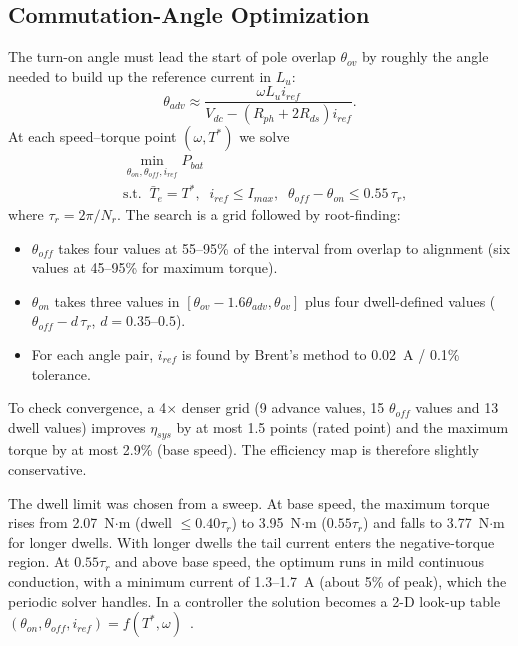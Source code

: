 \documentclass[journal]{IEEEtran}
\begin{document}
\subsection{Commutation-Angle Optimization}
The turn-on angle must lead the start of pole overlap $\theta_{ov}$ by roughly
the angle needed to build up the reference current in $L_u$:
\begin{equation}
\theta_{adv}\approx \frac{\omega L_u i_{ref}}{V_{dc}-(R_{ph}+2R_{ds})i_{ref}}.
\label{eq:adv}
\end{equation}
At each speed--torque point $(\omega,T^*)$ we solve
\begin{equation}
\begin{aligned}
&\min_{\theta_{on},\theta_{off},i_{ref}} P_{bat}\\
&\text{s.t.}\;\; \bar T_e=T^*,\;\; i_{ref}\le I_{max},\;\; \theta_{off}-\theta_{on}\le 0.55\,\tau_r,
\end{aligned}
\label{eq:opt}
\end{equation}
where $\tau_r=2\pi/N_r$. The search is a grid followed by root-finding:
\begin{itemize}
\item $\theta_{off}$ takes four values at 55--95\% of the interval from overlap
to alignment (six values at 45--95\% for maximum torque).
\item $\theta_{on}$ takes three values in $[\theta_{ov}-1.6\theta_{adv},\theta_{ov}]$
plus four dwell-defined values ($\theta_{off}-d\,\tau_r$, $d=0.35$--$0.5$).
\item For each angle pair, $i_{ref}$ is found by Brent's method to 0.02~A /
0.1\% tolerance.
\end{itemize}
To check convergence, a 4$\times$ denser grid (9 advance values, 15
$\theta_{off}$ values and 13 dwell values) improves $\eta_{sys}$ by at most 1.5
points (rated point) and the maximum torque by at most 2.9\% (base speed). The
efficiency map is therefore slightly conservative.

The dwell limit was chosen from a sweep. At base speed, the maximum torque
rises from 2.07~N$\cdot$m (dwell $\le0.40\tau_r$) to 3.95~N$\cdot$m
($0.55\tau_r$) and falls to 3.77~N$\cdot$m for longer dwells. With longer
dwells the tail current enters the negative-torque region. At $0.55\tau_r$ and
above base speed, the optimum runs in mild continuous conduction, with a
minimum current of 1.3--1.7~A (about 5\% of peak), which the periodic solver
handles. In a controller the solution becomes a 2-D look-up table
$(\theta_{on},\theta_{off},i_{ref})=f(T^*,\omega)$~\cite{kjaer1997,xue2010}.
\end{document}
